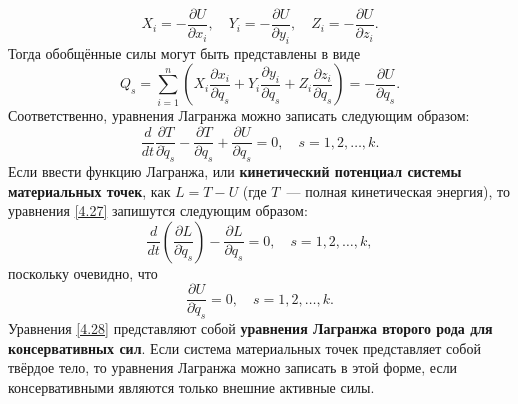 \documentclass[a4paper, 12pt]{report}
\numberwithin{equation}{section}
\begin{document}
	\begin{equation*}
		X_i = -\frac{\partial U}{\partial x_i}, \quad Y_i = -\frac{\partial U}{\partial y_i}, \quad Z_i = -\frac{\partial U}{\partial z_i}.
	\end{equation*}
	Тогда обобщённые силы могут быть представлены в виде
	\begin{equation*}
		Q_s = \sum_{i=1}^n \left( 
		X_i \frac{\partial x_i}{\partial q_s} + 
		Y_i \frac{\partial y_i}{\partial q_s} + 
		Z_i \frac{\partial z_i}{\partial q_s} 
		\right) = -\frac{\partial U}{\partial q_s}.
	\end{equation*}
	Соответственно, уравнения Лагранжа можно записать следующим образом:
	\begin{equation}
		\label{4.27}
		\frac{d}{dt} \frac{\partial T}{\partial \dot{q}_s} - \frac{\partial T}{\partial q_s} + \frac{\partial U}{\partial q_s} = 0, \quad s = 1, 2, \dots, k.
	\end{equation}
	Если ввести функцию Лагранжа, или \textbf{кинетический потенциал системы материальных точек}, как $L = T - U$ (где $T$~--- полная кинетическая энергия), то уравнения \eqref{4.27} запишутся следующим образом:
	\begin{equation}
		\label{4.28}
		\frac{d}{dt} \left( \frac{\partial L}{\partial \dot{q}_s} \right) - \frac{\partial L}{\partial q_s} = 0, \quad s = 1, 2, \ldots, k,
	\end{equation}
	поскольку очевидно, что
	\[
	\frac{\partial U}{\partial \dot{q}_s} = 0, \quad s = 1, 2, \ldots, k.
	\]
	Уравнения \eqref{4.28} представляют собой \textbf{уравнения Лагранжа второго рода для консервативных сил}.
	Если система материальных точек представляет собой твёрдое тело, то уравнения Лагранжа можно записать в этой форме, если консервативными являются только внешние активные силы.
	
\end{document}

